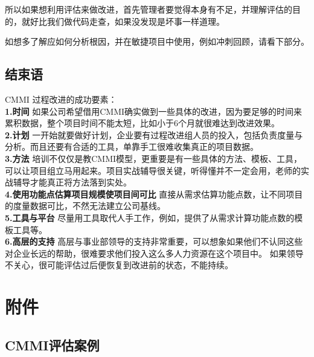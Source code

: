 
所以如果想利用评估来做改进，首先管理者要觉得本身有不足，并理解评估的目的，就好比我们做代码走查，如果没发现是坏事一样道理。

如想多了解应如何分析根因，并在敏捷项目中使用，例如冲刺回顾，请看下部分。

\hypertarget{ux603bux7ed3}{%
\subsection{结束语}\label{ux603bux7ed3}}

CMMI 过程改进的成功要素：\\
\textbf{1.时间}
如果公司希望借用CMMI确实做到一些具体的改进，因为要足够的时间来累积数据，整个项目时间不能太短，比如小于6个月就很难达到改进效果。\\
\textbf{2.计划}
一开始就要做好计划，企业要有过程改进组人员的投入，包括负责度量与分析。而且还要有合适的工具，单靠手工很难收集真正的项目数据。\\
\textbf{3.方法}
培训不仅仅是教CMMI模型，更重要是有一些具体的方法、模板、工具，可以让项目组立马用起来。项目实战辅导很关键，听得懂并不一定会用，老师的实战辅导才能真正将方法落到实处。\\
\textbf{4.使用功能点估算项目规模使项目间可比}
直接从需求估算功能点数，让不同项目的度量数据可比，不然无法建立公司基线。\\
\textbf{5.工具与平台}
尽量用工具取代人手工作，例如，提供了从需求计算功能点数的模板工具等。\\
\textbf{6.高层的支持}
高层与事业部领导的支持非常重要，可以想象如果他们不认同这些对企业长远的帮助，很难要求他们投入这么多人力资源在这个项目中。
如果领导不关心，很可能评估过后便恢复到改进前的状态，不能持续。

\hypertarget{ux9644ux4ef6}{%
\section{附件}\label{ux9644ux4ef6}}

\hypertarget{cmmiux8bc4ux4f30ux6848ux4f8b}{%
\subsection{CMMI评估案例}\label{cmmiux8bc4ux4f30ux6848ux4f8b}}

